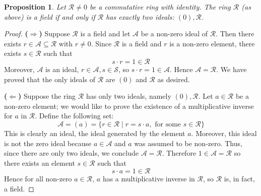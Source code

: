 \documentclass[12pt]{article}
\newtheorem{prop}{Proposition}
\begin{document}
\begin{prop}
Let $\mathcal{R}\neq 0$ be a commutative ring with identity. The ring $\mathcal{R}$ (as above) is a field if and only if
$\mathcal{R}$ has exactly two ideals: $(0),\mathcal{R}$.
\end{prop}

\begin{proof}
{\bf ($\Rightarrow$)} Suppose $\mathcal{R}$ is a field and let
$\mathcal{A}$ be a non-zero ideal of $\mathcal{R}$. Then there
exists $r\in \mathcal{A}\subseteq \mathcal{R}$ with $r\neq 0$.
Since $\mathcal{R}$ is a field and $r$ is a non-zero element,
there exists $s\in \mathcal{R}$ such that
$$s\cdot r =1 \in \mathcal{R}$$
Moreover, $\mathcal{A}$ is an ideal, $r\in \mathcal{A}, s\in
\mathcal{S}$, so $s\cdot r =1 \in \mathcal{A}$. Hence
$\mathcal{A}=\mathcal{R}$. We have proved that the only ideals of
$\mathcal{R}$ are $(0)$ and $\mathcal{R}$ as desired.

{\bf ($\Leftarrow$)} Suppose the ring $\mathcal{R}$ has only two
ideals, namely $(0),\mathcal{R}$. Let $a\in \mathcal{R}$ be a
non-zero element; we would like to prove the existence of a
multiplicative inverse for $a$ in $\mathcal{R}$. Define the
following set:
$$\mathcal{A}=(a)=\{r\in\mathcal{R} \mid r=s\cdot a, \text{ for
some } s\in\mathcal{R}\}$$ This is clearly an ideal, the ideal
generated by the element $a$. Moreover, this ideal is not the zero
ideal because $a\in \mathcal{A}$ and $a$ was assumed to be
non-zero. Thus, since there are only two ideals, we conclude
$\mathcal{A}=\mathcal{R}$. Therefore $1\in
\mathcal{A}=\mathcal{R}$ so there exists an element $s\in
\mathcal{R}$ such that
$$s\cdot a=1 \in \mathcal{R}$$
Hence for all non-zero $a\in \mathcal{R}$, $a$ has a multiplicative inverse in $\mathcal{R}$, so $\mathcal{R}$ is, in fact, a field.
\end{proof}
\end{document}
